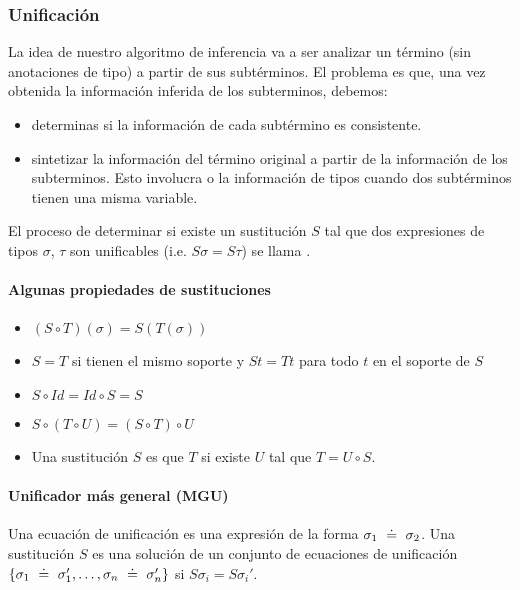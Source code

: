 \subsubsection{Unificación}

La idea de nuestro algoritmo de inferencia va a ser analizar un término (sin anotaciones de tipo) a partir de sus subtérminos. El problema es que, una vez obtenida la información inferida de los subterminos, debemos:
\begin{itemize}
  \item {} determinas si la información de cada subtérmino es consistente.
  \item {} sintetizar la información del término original a partir de la información de los subterminos. Esto involucra  o  la información de tipos cuando dos subtérminos tienen una misma variable.
\end{itemize}

El proceso de determinar si existe un sustitución $S$ tal que dos expresiones de tipos $\sigma$, $\tau$ son unificables (i.e. $S\sigma = S\tau$) se llama .

\paragraph{Algunas propiedades de sustituciones}

\begin{itemize}
  \item {} $(S \circ T)(\sigma) = S(T(\sigma))$
  \item {} $S = T$ si tienen el mismo soporte y $St = Tt$ para todo $t$ en el soporte de $S$
  \item $S \circ Id = Id \circ S = S$
  \item $S \circ (T \circ U) = (S \circ T) \circ U$
  \item Una sustitución $S$ es  que $T$ si existe $U$ tal que $T = U \circ S$.
\end{itemize}

\paragraph{Unificador más general (MGU)}

Una ecuación de unificación es una expresión de la forma $\sigma_1 \uni \sigma_2$. Una sustitución $S$ es una solución de un conjunto de ecuaciones de unificación $\{\sigma_1 \uni \sigma_1', \dots, \sigma_n \uni \sigma_n'\}$ si $S\sigma_i = S\sigma_i'$.

